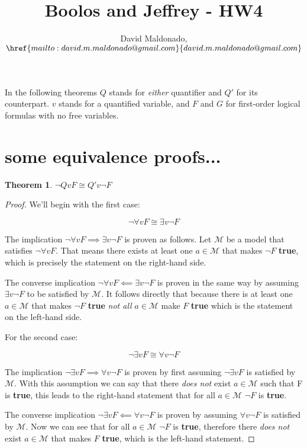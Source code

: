 \documentclass[a4paper,11pt]{article}
\author{David Maldonado, $\href{mailto:david.m.maldonado@gmail.com}%
{david.m.maldonado@gmail.com}$}
\title{Boolos and Jeffrey - HW4}
\newtheorem{thm}{Theorem}[section]
\begin{document}
\maketitle

\bigskip


In the following theorems $Q$ stands for \textit{either} quantifier and $Q'$ for its counterpart. $v$ stands for 
a quantified variable, and $F$ and $G$ for first-order logical formulas with no free variables.


\section{some equivalence proofs...}

\begin{thm}$\lnot Qv F \cong Q'v \lnot F $\end{thm}
	
	\begin{proof}
		We'll begin with the first case: 
		
		\begin{equation} \lnot \forall v F \cong \exists v \lnot F \end{equation}
		
		The implication $\lnot \forall v F \implies \exists v \lnot F$ is proven as follows. Let $\mathcal{M}$ be 
		a model that satisfies $\lnot \forall v F$. That means there exists at least one $a \in \mathcal{M}$ 
		that makes $\lnot F$ \textbf{true}, which is precisely the statement on the right-hand side.
		
		The converse implication $\lnot \forall v F \impliedby \exists v \lnot F$ is proven in the same way by
		assuming $\exists v \lnot F$ to be satisfied by $\mathcal{M}$. It follows directly that because there 
		is at least one $a \in \mathcal{M}$ that makes $\lnot F$ \textbf{true} \textit{not all} 
		$a \in \mathcal{M}$  make $F$ \textbf{true} which is the statement on the left-hand side.
		
		\bigskip
		
		For the second case:
		
		\begin{equation} \lnot \exists v F \cong \forall v \lnot F \end{equation}
		
		The implication $\lnot \exists v F \implies \forall v \lnot F$ is proven by first assuming $\lnot \exists v F$ 
		is satisfied by $\mathcal{M}$. With this assumption we can say that there \emph{does not} exist 
		$a \in \mathcal{M}$ such that F is \textbf{true}, this leads to the right-hand statement that for all
		$a \in \mathcal{M}$  $\lnot F$ is \textbf{true}.
		
		The converse implication $\lnot \exists v F \impliedby \forall v \lnot F$ is proven by assuming 
		$\forall v \lnot F$ is satisfied by $\mathcal{M}$. Now we can see that for all $a \in \mathcal{M}$ 
		$\lnot F$ is \textbf{true}, therefore there \emph{does not} exist $a \in \mathcal{M}$ that makes $F$ 
		\textbf{true}, which is the left-hand statement.
	\end{proof}
	
\end{document}
